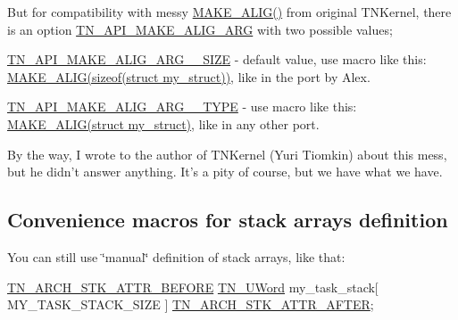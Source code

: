 But for compatibility with messy {\ttfamily \hyperlink{tn__oldsymbols_8h_aa42d2e6b5b7ff37bd485803fa2cb70a8}{M\+A\+K\+E\+\_\+\+A\+L\+I\+G()}} from original T\+N\+Kernel, there is an option {\ttfamily \hyperlink{tn__cfg__default_8h_a2a1148efc6a74131cc83ee50cbc386cd}{T\+N\+\_\+\+A\+P\+I\+\_\+\+M\+A\+K\+E\+\_\+\+A\+L\+I\+G\+\_\+\+A\+R\+G}} with two possible values;


\begin{DoxyItemize}
\item {\ttfamily \hyperlink{tn__common_8h_a4972bf0cbc72e51a7463cf7d786d2b64}{T\+N\+\_\+\+A\+P\+I\+\_\+\+M\+A\+K\+E\+\_\+\+A\+L\+I\+G\+\_\+\+A\+R\+G\+\_\+\+\_\+\+S\+I\+Z\+E}} -\/ default value, use macro like this\+: {\ttfamily \hyperlink{tn__oldsymbols_8h_aa42d2e6b5b7ff37bd485803fa2cb70a8}{M\+A\+K\+E\+\_\+\+A\+L\+I\+G(sizeof(struct my\+\_\+struct))}}, like in the port by Alex.
\item {\ttfamily \hyperlink{tn__common_8h_a04321413cf21754a05682b298df0493d}{T\+N\+\_\+\+A\+P\+I\+\_\+\+M\+A\+K\+E\+\_\+\+A\+L\+I\+G\+\_\+\+A\+R\+G\+\_\+\+\_\+\+T\+Y\+P\+E}} -\/ use macro like this\+: {\ttfamily \hyperlink{tn__oldsymbols_8h_aa42d2e6b5b7ff37bd485803fa2cb70a8}{M\+A\+K\+E\+\_\+\+A\+L\+I\+G(struct my\+\_\+struct)}}, like in any other port.
\end{DoxyItemize}

By the way, I wrote to the author of T\+N\+Kernel (Yuri Tiomkin) about this mess, but he didn't answer anything. It's a pity of course, but we have what we have.\hypertarget{tnkernel_diff_tnkernel_new_api__convenience_macros_stack}{}\subsection{Convenience macros for stack arrays definition}\label{tnkernel_diff_tnkernel_new_api__convenience_macros_stack}
You can still use \char`\"{}manual\char`\"{} definition of stack arrays, like that\+:


\begin{DoxyCode}
\hyperlink{tn__arch__example_8h_ae245dddb19cd7c12b7038a62d576fafa}{TN\_ARCH\_STK\_ATTR\_BEFORE}
\hyperlink{tn__arch__example_8h_ab80cba0fe9ffcd9011d53dfeb9e39bf4}{TN\_UWord} my\_task\_stack[ MY\_TASK\_STACK\_SIZE ]
\hyperlink{tn__arch__example_8h_ab082613959b539182b8b47bc87d18d6a}{TN\_ARCH\_STK\_ATTR\_AFTER};
\end{DoxyCode}



